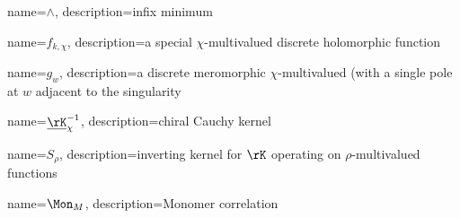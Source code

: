 	{name={\ensuremath{\wedge}}, 
	description={infix minimum}
}

	{name={\ensuremath{f_{k,\chi}}}, 
	description={a special $\chi$-multivalued discrete holomorphic function}
}

	{name={\ensuremath{g_w}}, 
	description={a discrete meromorphic $\chi$-multivalued (with a single pole at $w$ adjacent to the singularity}
}

	{name={\ensuremath{\protect\underline{\rK}^{-1}_\chi}}, 
	description={chiral Cauchy kernel}
}



	{name={\ensuremath{S_\rho}}, 
	description={inverting kernel for $\rK$ operating on $\rho$-multivalued functions}
}


	{name={\ensuremath{\Mon_M}}, 
	description={Monomer correlation}
}


